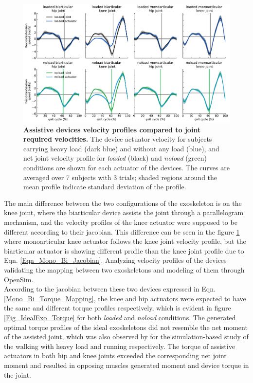 \documentclass[10pt,letterpaper]{article}
\begin{document}
\begin{figure}[ht]   
	\centering
	\includegraphics[width=\linewidth]{Ideal_Exo_MonovsBi_Figures/PaperFigure_Exoskeletons_Speed.pdf}
	\vspace{1mm}
	\caption{{\small\textbf{Assistive devices velocity profiles compared to joint required velocities.} The device actuator velocity for subjects carrying heavy load (dark blue) and without any load (blue), and net joint velocity profile for \textit{loaded} (black) and \textit{noload} (green) conditions are shown for each actuator of the devices. The curves are averaged over 7 subjects with 3 trials; shaded regions around the mean profile indicate standard deviation of the profile.}}
	\label{Fig_IdealExo_Speed}
\end{figure}
The main difference between the two configurations of the exoskeleton is on the knee joint, where the biarticular device assists the joint through a parallelogram mechanism, and the velocity profiles of the knee actuator were supposed to be different according to their jacobian. This difference can be seen in the figure \ref{Fig_IdealExo_Speed} where monoarticular knee actuator follows the knee joint velocity profile, but the biarticular actuator is showing different profile than the knee joint profile due to Eqn. \ref{Eqn_Mono_Bi_Jacobian}. Analyzing velocity profiles of the devices validating the mapping between two exoskeletons and modeling of them through OpenSim.\\
According to the jacobian between these two devices expressed in Eqn. \ref{Mono_Bi_Torque_Mapping}, the knee and hip actuators were expected to have the same and different torque profiles respectively, which is evident in figure \ref{Fig_IdealExo_Torque} for both \textit{loaded} and \textit{noload} conditions. The generated optimal torque profiles of the ideal exoskeletons did not resemble the net moment of the assisted joint, which was also observed by \cite{93,2} for the simulation-based study of the walking with heavy load and running respectively. The torque of assistive actuators in both hip and knee joints exceeded the corresponding net joint moment and resulted in opposing muscles generated moment and device torque in the joint.\\
\end{document}
